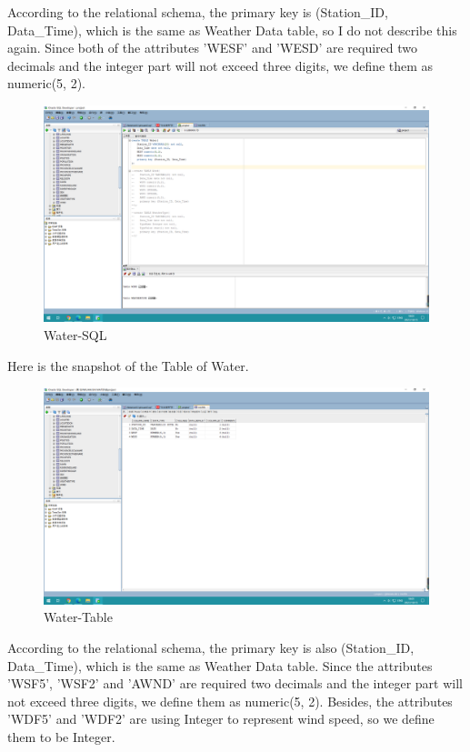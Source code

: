 \documentclass[]{article}
\begin{document}
	\noindent According to the relational schema, the primary key is (Station\_ID, Data\_Time), which is the same as Weather Data table, so I do not describe this again. Since both of the attributes 'WESF' and 'WESD' are required two decimals and the integer part will not exceed three digits, we define them as numeric(5, 2). \\
	
	\begin{figure}[H]
		\centering
		\includegraphics[width=0.95\linewidth]{../d3-p/water-sql}
		\caption{Water-SQL}
		\label{fig:water-sql}
	\end{figure}

	\noindent Here is the snapshot of the Table of Water. \\
	\begin{figure}[H]
		\centering
		\includegraphics[width=0.95\linewidth]{../d3-p/water}
		\caption{Water-Table}
		\label{fig:water}
	\end{figure}
	
	\noindent According to the relational schema, the primary key is also (Station\_ID, Data\_Time), which is the same as Weather Data table. Since the attributes 'WSF5', 'WSF2' and 'AWND' are required two decimals and the integer part will not exceed three digits, we define them as numeric(5, 2). Besides, the attributes 'WDF5' and 'WDF2' are using Integer to represent wind speed, so we define them to be Integer.\\
	
\end{document}

